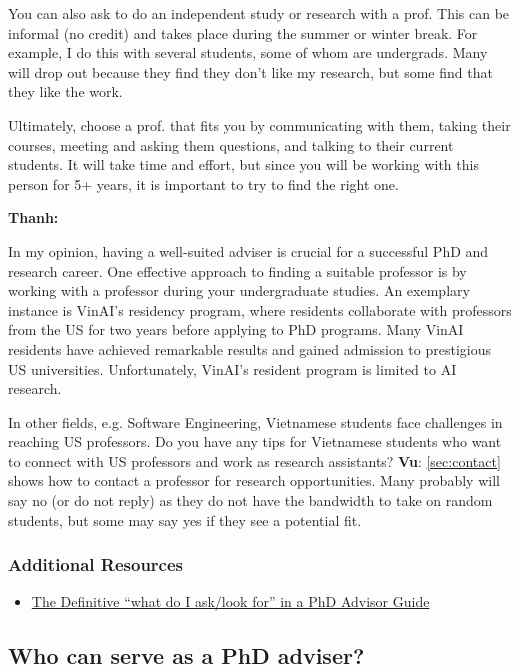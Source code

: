 \documentclass[oneside,11pt,dvipsnames]{book}
\newenvironment{commentbox}[1][]{
  \small
  \begin{mybox}
    {\small \textbf{#1}}
  }{
  \end{mybox}
}
\begin{document}
You can also ask to do an independent study or research with a prof. This can be informal (no credit) and takes place during the summer or winter break.  For example, I do this with several students, some of whom are undergrads. Many will drop out because they find they don't like my research, but some find that they like the work.

Ultimately, choose a prof. that fits you by communicating with them, taking their courses, meeting and asking them questions, and talking to their current students. It will take time and effort, but since you will be working with this person for 5+ years, it is important to try to find the right one.

\begin{commentbox}[Thanh:]
  In my opinion, having a well-suited adviser is crucial for a successful PhD and research career. One effective approach to finding a suitable professor is by working with a professor during your undergraduate studies. An exemplary instance is VinAI's residency program, where residents collaborate with professors from the US for two years before applying to PhD programs. Many VinAI residents have achieved remarkable results and gained admission to prestigious US universities. Unfortunately, VinAI's resident program is limited to AI research.

  In other fields, e.g. Software Engineering, Vietnamese students face challenges in reaching US professors. Do you have any tips for Vietnamese students who want to connect with US professors and work as research assistants?
  \tcblower
  \textbf{Vu}: \autoref{sec:contact} shows how to contact a professor for research opportunities. Many probably will say no (or do not reply) as they do not have the bandwidth to take on random students, but some may say yes if they see a potential fit.
\end{commentbox}

\subsubsection*{Additional Resources}
\begin{itemize}
  \item \href{https://www.cs.columbia.edu/wp-content/uploads/2019/03/Get-Advisor.pdf}{The Definitive ``what do I ask/look for'' in a PhD Advisor Guide}
\end{itemize}
\subsection{Who can serve as a PhD adviser?}\label{sec:faculty-types}
\end{document}
